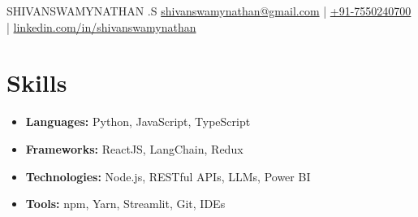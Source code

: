 \documentclass{article}
\newcommand{\hrefWithoutArrow}[2]{\href{#1}{#2}}
\begin{document}
    \newcommand{\AND}{\unskip
        \cleaders\copy\ANDbox\hskip\wd\ANDbox
        \ignorespaces
    }
    \newsavebox\ANDbox
    \sbox\ANDbox{$|$}

    \begin{center}
        \fontsize{25pt}{25pt}\selectfont SHIVANSWAMYNATHAN .S
        \vspace{5pt}
        \normalsize
        \mbox{\hrefWithoutArrow{mailto:shivanswamynathan@gmail.com}{shivanswamynathan@gmail.com}}
        \hspace{5pt} | \hspace{5pt}
        \mbox{\hrefWithoutArrow{tel:+91-7550240700}{+91-7550240700}}
        \hspace{5pt} | \hspace{5pt}
        \mbox{\hrefWithoutArrow{https://www.linkedin.com/in/shivanswamynathan}{linkedin.com/in/shivanswamynathan}}
    \end{center}
    \vspace{1cm}

    \section{Skills}
    \begin{itemize}[noitemsep, topsep=0pt]
        \item \textbf{Languages:} Python, JavaScript, TypeScript
        \item \textbf{Frameworks:} ReactJS, LangChain, Redux
        \item \textbf{Technologies:} Node.js, RESTful APIs, LLMs, Power BI
        \item \textbf{Tools:} npm, Yarn, Streamlit, Git, IDEs
    \end{itemize}
    \vspace{1cm}
\end{document}

